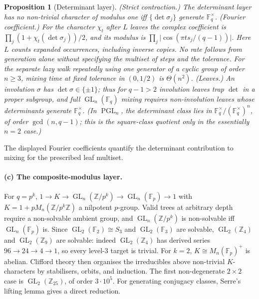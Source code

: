 \documentclass[11pt]{amsart}
\newtheorem{proposition}[proposition]{Proposition}
\theoremstyle{definition}
\theoremstyle{remark}
\theoremstyle{plain}
\theoremstyle{plain}
\numberwithin{equation}{section}
\DeclareMathOperator{\GL}{GL}
\DeclareMathOperator{\PGL}{PGL}
\newcommand{\abs}[1]{\lvert #1 \rvert}
\newcommand{\F}{\mathbb{F}}
\newcommand{\Z}{\mathbb{Z}}
\begin{document}
\begin{proposition}[Determinant layer]
\label{prop:det}
\emph{(Strict contraction.)} The determinant layer has no non-trivial character of modulus one iff
$\{\det\sigma_j\}$ generate $\F_q^\times$. \emph{(Fourier coefficient.)} For the character
$\chi_t$ after $L$ leaves the complex coefficient is
$\prod_j(1+\chi_t(\det\sigma_j))/2$, and its modulus is
$\prod_j\abs{\cos(\pi t s_j/(q-1))}$. Here $L$ counts expanded occurrences, including inverse copies. No rate follows
from generation alone without specifying the multiset of steps and the tolerance.
For the separate lazy walk repeatedly using one generator of a cyclic group of
order $n\ge3$, mixing time at fixed tolerance in $(0,1/2)$ is $\Theta(n^2)$. \emph{(Leaves.)} An involution
$\sigma$ has $\det\sigma\in\{\pm1\}$; thus for $q-1>2$ involution leaves trap $\det$ in a
proper subgroup, and full $\GL_n(\F_q)$ mixing \emph{requires non-involution leaves}
whose determinants generate $\F_q^\times$. {\normalfont(In $\PGL_n$, the determinant class lies in
$\F_q^\times/(\F_q^\times)^n$, of order $\gcd(n,q-1)$; this is the square-class quotient only in
the essentially $n=2$ case.)}
\end{proposition}

The displayed Fourier coefficients quantify the determinant contribution
to mixing for the prescribed leaf multiset.

\paragraph{(c) The composite-modulus layer.}
For $q=p^k$, $1\to K\to\GL_n(\Z/p^k)\to\GL_n(\F_p)\to1$ with
$K=1+pM_n(\Z/p^k\Z)$ a nilpotent
$p$-group. Valid trees at arbitrary depth require a non-solvable ambient
group, and $\GL_n(\Z/p^k)$ is non-solvable iff
$\GL_n(\F_p)$ is. Since $\GL_2(\F_2)\cong S_3$ and $\GL_2(\F_3)$ are solvable, $\GL_2(\Z_4)$
and $\GL_2(\Z_9)$ are solvable: indeed $\GL_2(\Z_4)$ has derived series
$96\to24\to4\to1$, so every level-$3$ target is trivial.
For $k=2$, $K\cong M_n(\F_p)^{+}$ is abelian. Clifford theory then organises the irreducibles
above non-trivial $K$-characters by stabilisers, orbits, and induction.
The first non-degenerate $2\times2$ case is $\GL_2(\Z_{25})$, of order
$3\cdot10^5$. For generating conjugacy classes, Serre's lifting lemma
gives a direct reduction.
\end{document}
